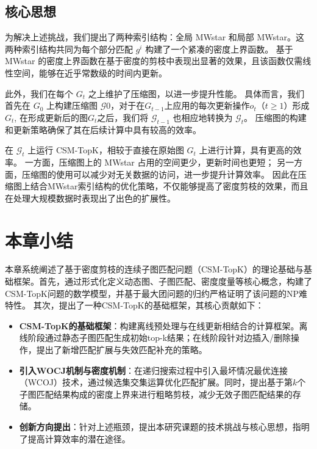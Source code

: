 \subsection{核心思想}
为解决上述挑战，我们提出了两种索引结构：全局 MWstar 和局部 MWstar。这两种索引结构共同为每个部分匹配 $g^i$ 构建了一个紧凑的密度上界函数。
基于 MWstar 的密度上界函数在基于密度的剪枝中表现出显著的效果，且该函数仅需线性空间，能够在近乎常数级的时间内更新。

此外，我们在每个 $G_t$ 之上维护了压缩图，以进一步提升性能。
具体而言，我们首先在 $G_0$ 上构建压缩图 $\mathcal{G}0$，对于在$G_{t-1}$上应用的每次更新操作$o_t$（$t \geq 1$）形成$G_t$,
在形成更新后的图$G_t$之后，我们将 $\mathcal{G}_{t-1}$ 也相应地转换为 $\mathcal{G}_t$。
压缩图的构建和更新策略确保了其在后续计算中具有较高的效率。

在 $\mathcal{G}_t$ 上运行 CSM-TopK，相较于直接在原始图 $G_t$ 上进行计算，具有更高的效率。
一方面，压缩图上的 MWstar 占用的空间更少，更新时间也更短；
另一方面，压缩图的使用可以减少对无关数据的访问，进一步提升计算效率。
因此在压缩图上结合MWstar索引结构的优化策略，不仅能够提高了密度剪枝的效果，而且在处理大规模数据时表现出了出色的扩展性。
\section{本章小结}
本章系统阐述了基于密度剪枝的连续子图匹配问题（CSM-TopK）的理论基础与基础框架。首先，通过形式化定义动态图、子图匹配、密度度量等核心概念，构建了CSM-TopK问题的数学模型，并基于最大团问题的归约严格证明了该问题的NP难特性。
其次，提出了一种CSM-TopK的基础框架，其核心贡献如下：
\begin{itemize}
\item \textbf{CSM-TopK的基础框架}：构建离线预处理与在线更新相结合的计算框架。离线阶段通过静态子图匹配生成初始top-k结果；在线阶段针对边插入/删除操作，提出了新增匹配扩展与失效匹配补充的策略。

\item \textbf{引入WOCJ机制与密度机制}：在递归搜索过程中引入最坏情况最优连接（WCOJ）技术，通过候选集交集运算优化匹配扩展。同时，提出基于第$k$个子图匹配结果构成的密度上界来进行粗略剪枝，减少无效子图匹配结果的存储。

\item \textbf{创新方向提出}：针对上述瓶颈，提出本研究课题的技术挑战与核心思想，指明了提高计算效率的潜在途径。
\end{itemize}    
